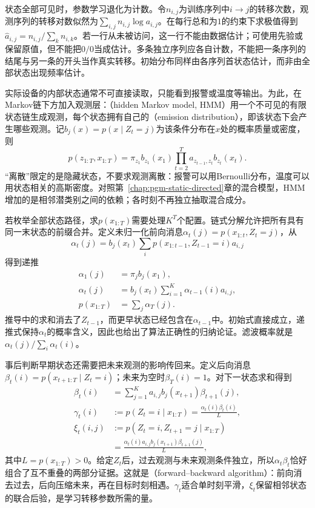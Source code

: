 状态全部可见时，参数学习退化为计数。令$n_{i,j}$为训练序列中$i\to j$的转移次数，观测序列的转移对数似然为$\sum_{i,j}n_{i,j}\log a_{i,j}$。在每行总和为$1$的约束下求极值得到$\widehat a_{i,j}=n_{i,j}/\sum_k n_{i,k}$。若一行从未被访问，这一行不能由数据估计；可使用先验或保留原值，但不能把$0/0$当成估计。多条独立序列应各自计数，不能把一条序列的结尾与另一条的开头当作真实转移。初始分布同样由各序列首状态估计，而非由全部状态出现频率估计。

实际设备的内部状态通常不可直接读取，只能看到报警或温度等输出。为此，在Markov链下方加入观测层：（hidden Markov model, HMM）用一个不可见的有限状态链生成观测，每个状态拥有自己的（emission distribution），即该状态下会产生哪些观测。记$b_j(x)=p(x\mid Z_t=j)$为该条件分布在$x$处的概率质量或密度，则
\begin{equation}
  p(z_{1:T},x_{1:T})
    =\pi_{z_1}b_{z_1}(x_1)
      \prod_{t=2}^{T}a_{z_{t-1},z_t}b_{z_t}(x_t).
  \label{eq:pgm-dynamic-hmm}
\end{equation}
“离散”限定的是隐藏状态，不要求观测离散：报警可以用Bernoulli分布，温度可以用状态相关的高斯密度。对照第~\ref{chap:pgm-static-directed}章的混合模型，HMM增加的是相邻潜类别之间的依赖；各时刻不再独立抽取混合成分。

若枚举全部状态路径，求$p(x_{1:T})$需要处理$K^T$个配置。链式分解允许把所有具有同一末状态的前缀合并。定义未归一化前向消息$\alpha_t(j)=p(x_{1:t},Z_t=j)$，从
\[
  \alpha_t(j)
    =b_j(x_t)\sum_i
      p(x_{1:t-1},Z_{t-1}=i)a_{i,j}
\]
得到递推
\begin{equation}
  \begin{aligned}
    \alpha_1(j)&=\pi_jb_j(x_1),\\
    \alpha_t(j)&=b_j(x_t)\sum_{i=1}^{K}
      \alpha_{t-1}(i)a_{i,j},\\
    p(x_{1:T})&=\sum_j\alpha_T(j).
  \end{aligned}
  \label{eq:pgm-dynamic-forward}
\end{equation}
推导中的求和消去了$Z_{t-1}$，而更早状态已经包含在$\alpha_{t-1}$中。初始式直接成立，递推式保持$\alpha_t$的概率含义，因此也给出了算法正确性的归纳论证。滤波概率就是$\alpha_t(j)/\sum_i\alpha_t(i)$。

事后判断早期状态还需要把未来观测的影响传回来。定义后向消息$\beta_t(i)=p(x_{t+1:T}\mid Z_t=i)$；未来为空时$\beta_T(i)=1$。对下一状态求和得到
\begin{equation}
  \begin{aligned}
    \beta_t(i)&=\sum_{j=1}^{K}
      a_{i,j}b_j(x_{t+1})\beta_{t+1}(j),\\
    \gamma_t(i)&:=p(Z_t=i\mid x_{1:T})
      =\frac{\alpha_t(i)\beta_t(i)}{L},\\
    \xi_t(i,j)&:=p(Z_t=i,Z_{t+1}=j\mid x_{1:T})\\
      &=\frac{\alpha_t(i)a_{i,j}b_j(x_{t+1})
        \beta_{t+1}(j)}{L},
  \end{aligned}
  \label{eq:pgm-dynamic-backward}
\end{equation}
其中$L=p(x_{1:T})>0$。给定$Z_t$后，过去观测与未来观测条件独立，所以$\alpha_t\beta_t$恰好组合了互不重叠的两部分证据。这就是（forward--backward algorithm）：前向消去过去，后向压缩未来，再在目标时刻相遇。$\gamma_t$适合单时刻平滑，$\xi_t$保留相邻状态的联合后验，是学习转移参数所需的量。

